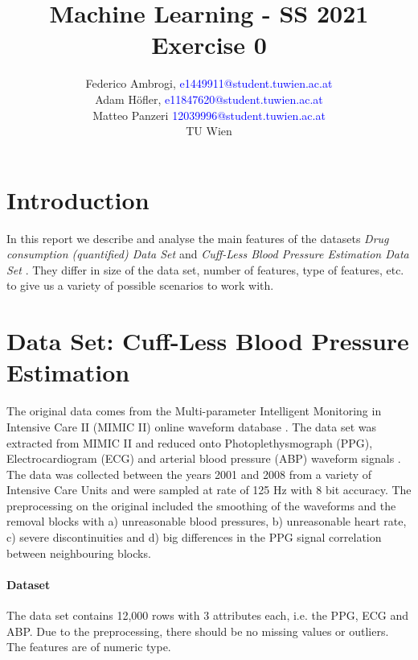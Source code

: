 \documentclass{article}
\begin{document}
\title{ Machine Learning - SS 2021 \\ Exercise 0 }


	\author{Federico Ambrogi, \textcolor{blue} {e1449911@student.tuwien.ac.at } \\
	Adam Höfler, \textcolor{blue} {e11847620@student.tuwien.ac.at } \\
	Matteo Panzeri \textcolor{blue}{12039996@student.tuwien.ac.at } \\
    TU Wien }






\maketitle
\setcounter{tocdepth}{2}
\tableofcontents

\section*{Introduction}
In this report we describe and analyse the main features of the datasets \textit{Drug consumption (quantified) Data Set
}\cite{DrugConsumption} and \textit{Cuff-Less Blood Pressure Estimation Data Set} \cite{BloodPressure}.
They differ in size of the data set, number of features, type of features, etc. to give us a variety of possible scenarios to work with.

\section{Data Set: Cuff-Less Blood Pressure Estimation}
The original data comes from the Multi-parameter Intelligent Monitoring in Intensive Care II (MIMIC II) online waveform database \cite{BloodPressureDatabase}\cite{Goldberger2000PhysioBankPA}. The data set was extracted from MIMIC II and reduced onto Photoplethysmograph (PPG), Electrocardiogram (ECG) and arterial blood pressure (ABP) waveform signals \cite{Kachuee2015CufflessHC}. The data was collected between the years 2001 and 2008 from a variety of Intensive Care Units and were sampled at rate of 125 Hz with 8 bit accuracy. The preprocessing on the original included the smoothing of the waveforms and the removal blocks with a) unreasonable blood pressures, b) unreasonable heart rate, c) severe discontinuities and d) big differences in the PPG signal correlation between neighbouring blocks.

\paragraph{Dataset}
\noindent The data set contains 12,000 rows with 3 attributes each, i.e. the PPG, ECG and ABP. Due to the preprocessing, there should be no missing values or outliers. The features are of numeric type.
\end{document}
